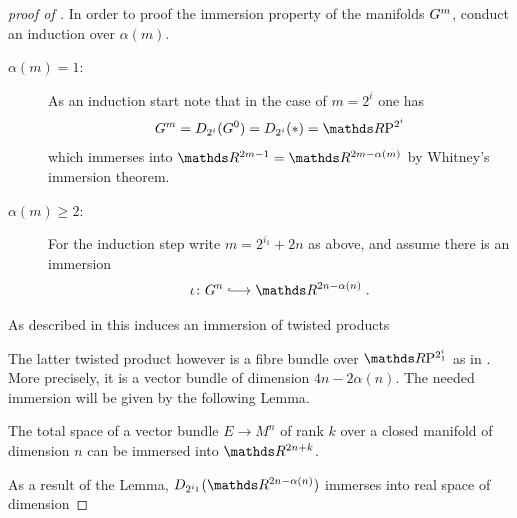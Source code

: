 \begin{proof}[proof of
  ]
  In order to proof the immersion property of the manifolds $G^{m}$,
  conduct an induction over $\alpha(m)$.
  \begin{description}
  \item[$\alpha(m)=1$:]
    As an induction start note that in the case of $m=2^i$ one has
    \begin{gather*}
      \G m
      =\Twistedprod{2^i}{\G 0}
      =\Twistedprod{2^i}{\pt}
      =\RP{2^i}
    \end{gather*}
    which immerses into $\R^{2m-1}=\R^{2m-\alpha(m)}$ by
    Whitney's immersion theorem. %
  \item[$\alpha(m)\geq2$:]
    For the induction step write $m=2^{i_1}+2n$ as above, and assume
    there is an immersion
    \begin{gather*}
      \iota\colon\G n \immlongto \R^{2n-\alpha(n)}
      \;.
    \end{gather*}
  \end{description}
  As described in
  this induces an immersion of twisted products
  \begin{center}
  \end{center}
  The latter twisted product however is a fibre bundle over
  $\RP{2^i_1}$ as in
  .
  More precisely, it is a vector bundle of dimension $4n-2\alpha(n)$.
  The needed immersion will be given by the following Lemma.
  \begin{Lem}
    The total space of a vector bundle $E\to M^n$ of rank $k$ over a
    closed manifold of dimension $n$ can be immersed into $\R^{2n+k}$.
  \end{Lem}
  As a result of the Lemma, $\Twistedprod{2^{i_1}}{\R^{2n-\alpha(n)}}$
  immerses into real space of dimension

\end{proof}
